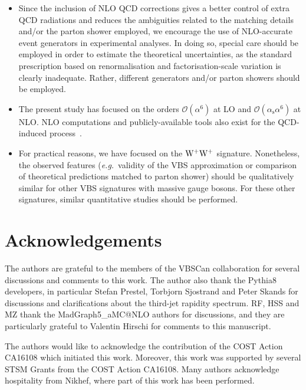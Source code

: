 \documentclass[twocolumn,epjc3]{svjour3} %
\newcommand{\alphas}{\ensuremath{\alpha_\text{s}}\xspace}
\begin{document}
\begin{itemize}
    \item Since the inclusion of NLO QCD corrections gives a better control of extra QCD radiations and reduces the ambiguities related to the 
        matching details and/or the parton shower employed, we encourage the use of NLO-accurate event generators in experimental analyses. In doing
        so, special care should be employed in order to estimate the theoretical uncertainties, as the standard prescription based on 
        renormalisation and factorisation-scale variation is clearly inadequate. Rather, different generators and/or parton showers should be employed.

    \item The present study has focused on the orders $\mathcal{O}{\left(\alpha^{6}\right)}$ at 
    LO and $\mathcal{O}{\left(\alphas\alpha^{6}\right)}$ at NLO. NLO computations and publicly-available tools also exist for the QCD-induced process~\cite{Rauch:2016pai,Melia:2010bm,Melia:2011gk,Campanario:2013gea,Baglio:2014uba,Biedermann:2017bss,Alwall:2014hca}.

    \item For practical reasons, we have focused on the ${\rm W}^+{\rm W}^+$ signature. Nonetheless, 
    the observed features 
    (\emph{e.g.}\ validity of the VBS approximation or comparison of theoretical predictions matched to parton shower) should 
    be qualitatively similar for other VBS signatures with massive gauge bosons. For these other signatures, similar quantitative studies should be performed.
 \end{itemize} 


\section*{Acknowledgements}

The authors are grateful to the members of the VBSCan collaboration for several discussions and comments to this work. The author also thank
the {\sc Pythia8} developers, in particular Stefan Prestel, Torbjorn Sjostrand and Peter Skands for 
discussions and clarifications about the third-jet rapidity spectrum. RF, HSS and MZ thank the {\sc MadGraph5\_aMC@NLO} authors for discussions, and
they are particularly grateful to Valentin Hirschi for comments to this manuscript.

The authors would like to acknowledge the contribution of the COST Action CA16108 which initiated this work.
Moreover, this work was supported by several STSM Grants from the COST Action CA16108.
Many authors acknowledge hospitality from Nikhef, where part of this work has been performed.
\end{document}
